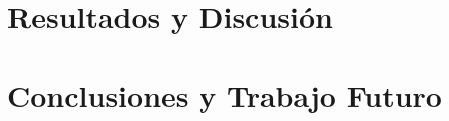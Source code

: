 \documentclass[12pt, twoside,openany]{book}
\begin{document}
\chapter{Resultados y Discusión}
\label{chap:results}



%


\chapter{Conclusiones y Trabajo Futuro}
\label{chap:conclusions}





% 
% 


\appendix  
\clearpage %
\addappheadtotoc 
\appendixpage 


\end{document}
